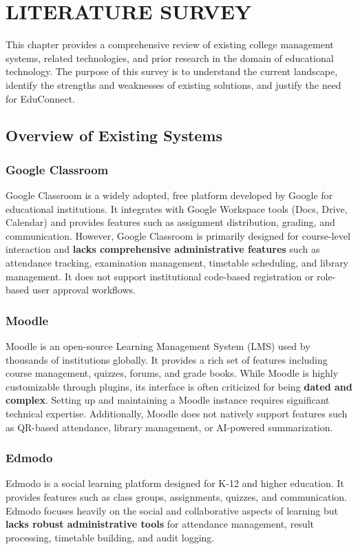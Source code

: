 \newpage
\section{LITERATURE SURVEY}
\hline

This chapter provides a comprehensive review of existing college management systems, related technologies, and prior research in the domain of educational technology. The purpose of this survey is to understand the current landscape, identify the strengths and weaknesses of existing solutions, and justify the need for EduConnect.

\subsection{Overview of Existing Systems}

\subsubsection{Google Classroom}
Google Classroom is a widely adopted, free platform developed by Google for educational institutions. It integrates with Google Workspace tools (Docs, Drive, Calendar) and provides features such as assignment distribution, grading, and communication. However, Google Classroom is primarily designed for course-level interaction and \textbf{lacks comprehensive administrative features} such as attendance tracking, examination management, timetable scheduling, and library management. It does not support institutional code-based registration or role-based user approval workflows.

\subsubsection{Moodle}
Moodle is an open-source Learning Management System (LMS) used by thousands of institutions globally. It provides a rich set of features including course management, quizzes, forums, and grade books. While Moodle is highly customizable through plugins, its interface is often criticized for being \textbf{dated and complex}. Setting up and maintaining a Moodle instance requires significant technical expertise. Additionally, Moodle does not natively support features such as QR-based attendance, library management, or AI-powered summarization.

\subsubsection{Edmodo}
Edmodo is a social learning platform designed for K-12 and higher education. It provides features such as class groups, assignments, quizzes, and communication. Edmodo focuses heavily on the social and collaborative aspects of learning but \textbf{lacks robust administrative tools} for attendance management, result processing, timetable building, and audit logging.

